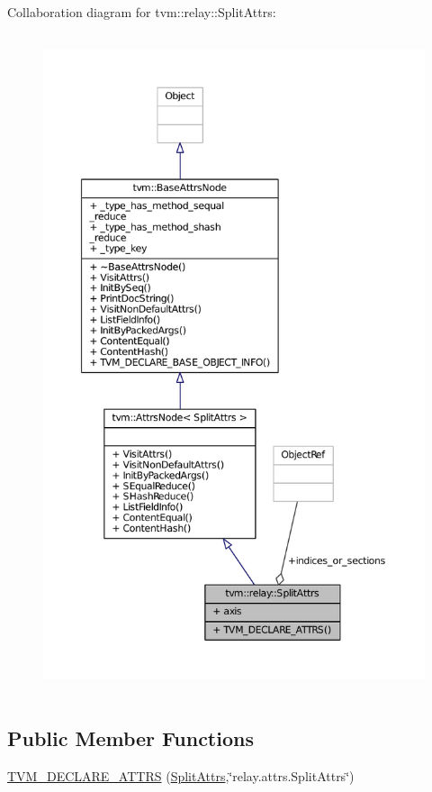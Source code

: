 Collaboration diagram for tvm\+:\+:relay\+:\+:Split\+Attrs\+:
\nopagebreak
\begin{figure}[H]
\begin{center}
\leavevmode
\includegraphics[height=550pt]{structtvm_1_1relay_1_1SplitAttrs__coll__graph}
\end{center}
\end{figure}
\subsection*{Public Member Functions}
\begin{DoxyCompactItemize}
\item 
\hyperlink{structtvm_1_1relay_1_1SplitAttrs_a7eed8fdadb552057795ce0bf983f77e9}{T\+V\+M\+\_\+\+D\+E\+C\+L\+A\+R\+E\+\_\+\+A\+T\+T\+RS} (\hyperlink{structtvm_1_1relay_1_1SplitAttrs}{Split\+Attrs},\char`\"{}relay.\+attrs.\+Split\+Attrs\char`\"{})
\end{DoxyCompactItemize}
